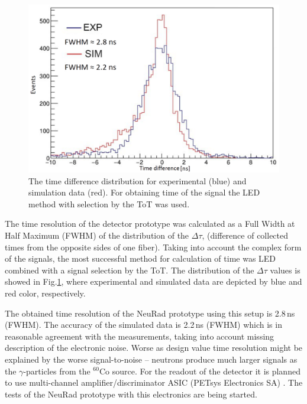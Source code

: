 \documentclass{webofc}
\begin{document}
\begin{figure}
	\centering
	\includegraphics[width=0.6\linewidth]{tausim.png}
	\caption{The time difference distribution for experimental (blue) and simulation data (red). For obtaining time of the signal the LED method with selection by the ToT was used.}\label{ris:tausim}
\end{figure}
	
The time resolution of the detector prototype was calculated as a Full Width at Half Maximum (FWHM) of the distribution of the $\Delta \tau$, (difference of collected times from the opposite sides of one fiber).
%
%
Taking into account the complex form of the signals, the most successful method for calculation of time was LED combined with a signal selection by the ToT.
The distribution of the $\Delta \tau$ values is showed in Fig.\ref{ris:tausim}, where experimental and simulated data are depicted by blue and red color, respectively.

The obtained time resolution of the NeuRad prototype using this setup is 2.8\,ns (FWHM). The accuracy of the simulated data is 2.2\,ns (FWHM) which is in reasonable agreement with the measurements, taking into account missing description of the electronic noise. Worse as design value time resolution might be explained by the worse signal-to-noise – neutrons produce much larger signals as the $\gamma$-particles from the $^{60}$Co source. For the readout of the detector it is planned to use multi-channel amplifier/discriminator ASIC (PETsys Electronics SA) \cite{petsys}. The tests of the NeuRad prototype with this electronics are being started.

\end{document}
